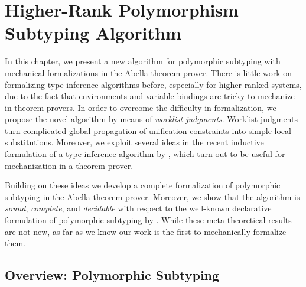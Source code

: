 \chapter{Higher-Rank Polymorphism Subtyping Algorithm}
\label{chap:ITP}

In this chapter, we present a new algorithm for polymorphic subtyping
with mechanical formalizations in the Abella theorem prover.
There is little work on formalizing type inference algorithms before,
especially for higher-ranked systems,
due to the fact that environments and variable bindings are
tricky to mechanize in theorem provers.
In order to overcome the difficulty in formalization,
we propose the novel algorithm by means of \emph{worklist judgments}.
Worklist judgments turn complicated
global propagation of unification constraints into simple local substitutions.
Moreover, we exploit several ideas in the recent inductive
formulation of a type-inference algorithm by
\citet{dunfield2013complete}, which turn out to be useful
for mechanization in a theorem prover.

Building on these ideas we develop a complete formalization of
polymorphic subtyping in the Abella theorem prover. Moreover, we
 show that the algorithm is \emph{sound}, \emph{complete}, and \emph{decidable} with
respect to the well-known declarative formulation of polymorphic subtyping by
\citet{odersky1996putting}.
While these meta-theoretical results are not new, as far
as we know our work is the first to mechanically formalize them.


\section{Overview: Polymorphic Subtyping}










